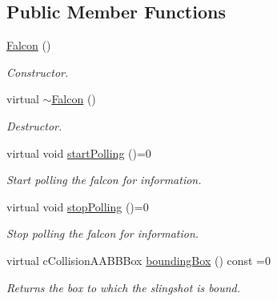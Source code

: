 \subsection*{Public Member Functions}
\begin{DoxyCompactItemize}
\item 
\hypertarget{classFalcon_ae571e7658369b1b4473c5aa75d407299}{
\hyperlink{classFalcon_ae571e7658369b1b4473c5aa75d407299}{Falcon} ()}
\label{classFalcon_ae571e7658369b1b4473c5aa75d407299}

\begin{DoxyCompactList}\small\item\em Constructor. \item\end{DoxyCompactList}\item 
\hypertarget{classFalcon_aae1dd1036d4fde5216a76989f5e02a47}{
virtual \hyperlink{classFalcon_aae1dd1036d4fde5216a76989f5e02a47}{$\sim$Falcon} ()}
\label{classFalcon_aae1dd1036d4fde5216a76989f5e02a47}

\begin{DoxyCompactList}\small\item\em Destructor. \item\end{DoxyCompactList}\item 
\hypertarget{classFalcon_a4de207fe80e98bf959ed7a41dca6012d}{
virtual void \hyperlink{classFalcon_a4de207fe80e98bf959ed7a41dca6012d}{startPolling} ()=0}
\label{classFalcon_a4de207fe80e98bf959ed7a41dca6012d}

\begin{DoxyCompactList}\small\item\em Start polling the falcon for information. \item\end{DoxyCompactList}\item 
\hypertarget{classFalcon_ade1bdf4fb8825aa69927418045227e72}{
virtual void \hyperlink{classFalcon_ade1bdf4fb8825aa69927418045227e72}{stopPolling} ()=0}
\label{classFalcon_ade1bdf4fb8825aa69927418045227e72}

\begin{DoxyCompactList}\small\item\em Stop polling the falcon for information. \item\end{DoxyCompactList}\item 
virtual cCollisionAABBBox \hyperlink{classFalcon_a8113221c67437ed4f726af6d68c0e66e}{boundingBox} () const =0
\begin{DoxyCompactList}\small\item\em Returns the box to which the slingshot is bound. \item\end{DoxyCompactList}\end{DoxyCompactItemize}



